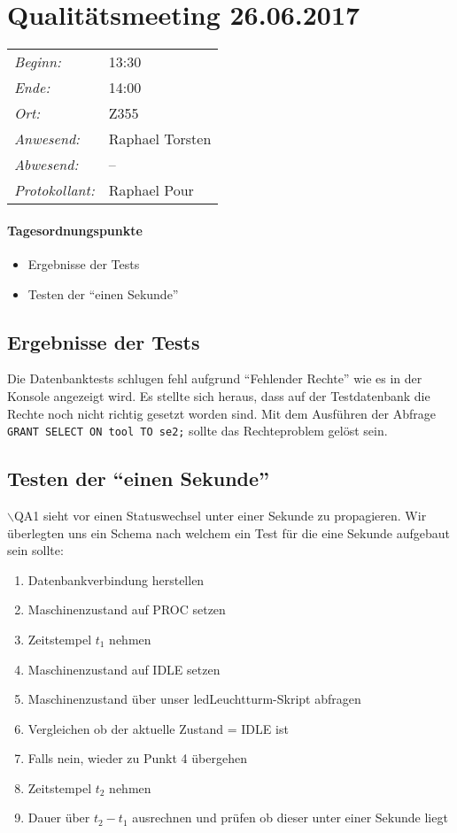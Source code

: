 \documentclass{scrartcl}
\date{26.06.2017}	%
\begin{document}
\maketitle
\section{Qualitätsmeeting 26.06.2017}	%
\begin{tabular}[t]{p{.25\linewidth} p{.25\linewidth}}
\emph{Beginn:}				& 13:30\\
\emph{Ende:}					& 14:00\\
\emph{Ort:}						& Z355\\
\emph{Anwesend:}	& 
Raphael\newline
Torsten
\\
\emph{Abwesend:}		 & 
--
\\
\emph{Protokollant:}& Raphael Pour
\end{tabular}
\paragraph{Tagesordnungspunkte}
\begin{itemize}
\item Ergebnisse der Tests
\item Testen der ``einen Sekunde''
\end{itemize}

\subsection{Ergebnisse der Tests}
Die Datenbanktests schlugen fehl aufgrund ``Fehlender Rechte'' wie es in der Konsole angezeigt wird. Es stellte sich heraus, dass auf der Testdatenbank die Rechte noch nicht richtig gesetzt worden sind. Mit dem Ausführen der Abfrage \texttt{GRANT SELECT ON tool TO se2;} sollte das Rechteproblem gelöst sein.

\subsection{Testen der ``einen Sekunde''}
$\backslash$QA1 sieht vor einen Statuswechsel unter einer Sekunde zu propagieren. 
Wir überlegten uns ein Schema nach welchem ein Test für die eine Sekunde aufgebaut sein sollte:
\begin{enumerate}
    \item Datenbankverbindung herstellen
    \item Maschinenzustand auf PROC setzen
    \item Zeitstempel $t_1$ nehmen
    \item Maschinenzustand auf IDLE setzen
    \item Maschinenzustand über unser ledLeuchtturm-Skript abfragen
    \item Vergleichen ob der aktuelle Zustand = IDLE ist
    \item Falls nein, wieder zu Punkt 4 übergehen
    \item Zeitstempel $t_2$ nehmen
    \item Dauer über $t_2-t_1$ ausrechnen und prüfen ob dieser unter einer Sekunde liegt
\end{enumerate}
\end{document}
